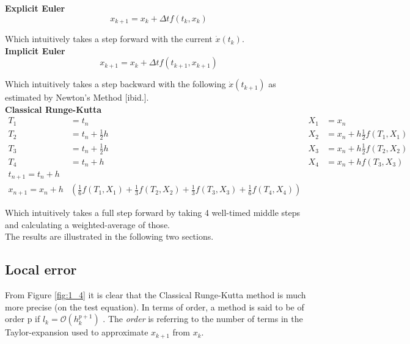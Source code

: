 \textbf{Explicit Euler \cite{JrgensenScientificEquationsb}}
\begin{equation}
    x_{k+1}=x_{k}+\Delta t f\left(t_{k}, x_{k}\right)
\end{equation}

Which intuitively takes a step forward with the current $\dot{x}(t_k)$.
\\
\textbf{Implicit Euler \cite{JrgensenScientificEquationsb}}
\begin{equation}
    x_{k+1}=x_{k}+\Delta t f\left(t_{k+1}, x_{k+1}\right)
\end{equation}

Which intuitively takes a step backward with the following $\dot{x}(t_{k+1})$ as estimated by Newton's Method [ibid.].
\\
\textbf{Classical Runge-Kutta \cite{JrgensenRunge-KuttaEquations}}
$$
\begin{aligned}
T_{1} &=t_{n} & X_{1} &=x_{n} \\
T_{2} &=t_{n}+\frac{1}{2} h & X_{2} &=x_{n}+h \frac{1}{2} f\left(T_{1}, X_{1}\right) \\
T_{3} &=t_{n}+\frac{1}{2} h & X_{3} &=x_{n}+h \frac{1}{2} f\left(T_{2}, X_{2}\right) \\
T_{4} &=t_{n}+h & X_{4} &=x_{n}+h f\left(T_{3}, X_{3}\right) \\
 t_{n+1}=t_{n}+h & & \\
 x_{n+1}=x_{n}+h &\left(\frac{1}{6} f\left(T_{1}, X_{1}\right)+\frac{1}{3} f\left(T_{2}, X_{2}\right)+\frac{1}{3} f\left(T_{3}, X_{3}\right)+\frac{1}{6} f\left(T_{4}, X_{4}\right)\right)
\end{aligned}
$$

Which intuitively takes a full step forward by taking 4 well-timed middle steps and calculating a weighted-average of those.
\\

The results are illustrated in the following two sections.






\subsection{Local error}
From Figure \ref{fig:1_4} it is clear that the Classical Runge-Kutta method is much more precise (on the test equation). In terms of order, a method is said to be of order p if $l_{k}=\mathcal{O}\left(h_{k}^{p+1}\right)$ \cite{JrgensenScientificEquationsc}. The \textit{order} is referring to the number of terms in the Taylor-expansion used to approximate $x_{k+1}$ from $x_k$.

